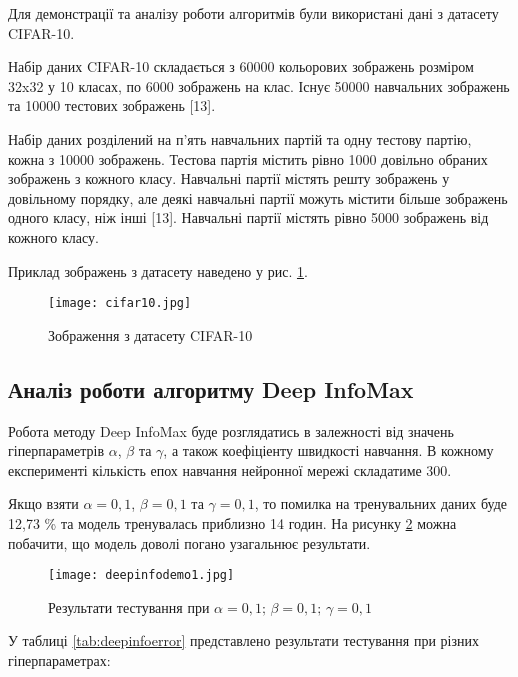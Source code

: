 Для демонстрації та аналізу роботи алгоритмів були використані дані з датасету CIFAR-10.

Набір даних CIFAR-10 складається з 60000 кольорових зображень розміром 32x32 у 10 класах, по 6000 зображень на клас. Існує 50000 навчальних зображень та 10000 тестових зображень [13].

Набір даних розділений на п’ять навчальних партій та одну тестову партію, кожна з 10000 зображень. Тестова партія містить рівно 1000 довільно обраних зображень з кожного класу. Навчальні партії містять решту зображень у довільному порядку, але деякі навчальні партії можуть містити більше зображень одного класу, ніж інші [13]. Навчальні партії містять рівно 5000 зображень від кожного класу.

Приклад зображень з датасету наведено у рис. \ref{fig:cifar10}.


\begin{figure}[h]
  \texttt{[image: cifar10.jpg]}
  \caption{Зображення з датасету CIFAR-10}
  \label{fig:cifar10}
\end{figure}

\subsection{Аналіз роботи алгоритму Deep InfoMax}

Робота методу Deep InfoMax буде розглядатись в залежності від значень гіперпараметрів $\alpha$, $\beta$ та $\gamma$, а також коефіціенту швидкості навчання. В кожному експерименті кількість епох навчання нейронної мережі складатиме 300.

Якщо взяти $\alpha = 0,1$, $\beta = 0,1$ та $\gamma = 0,1$, то помилка на тренувальних даних буде 12,73 \% та модель тренувалась приблизно 14 годин.
На рисунку \ref{fig:deepinfodemo1} можна побачити, що модель доволі погано узагальнює результати.

\newpage

\begin{figure}[h]
  \texttt{[image: deepinfodemo1.jpg]}
  \caption{Результати тестування при $\alpha = 0,1; \, \beta = 0,1; \, \gamma = 0,1$}
  \label{fig:deepinfodemo1}
\end{figure}

У таблиці \ref{tab:deepinfoerror} представлено результати тестування при різних гіперпараметрах:


